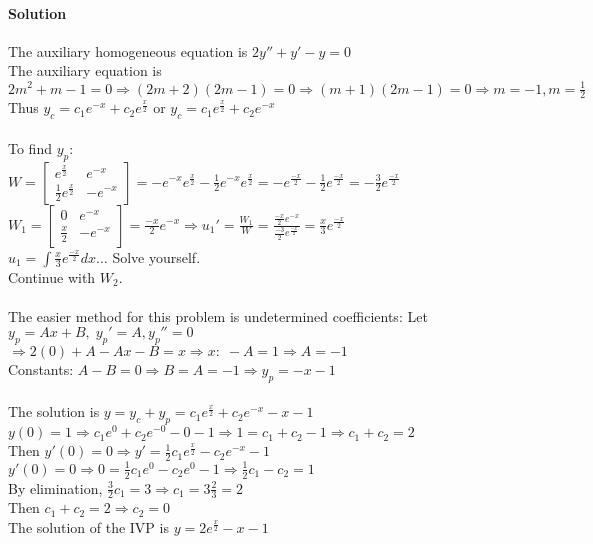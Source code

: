 \documentclass{article}
\newcommand{\mat}[4]{\begin{bmatrix} #1 & #2 \\ #3 & #4 \end{bmatrix}}
\begin{document}
\paragraph{Solution} The auxiliary homogeneous equation is $2y''+y'-y=0$
\\The auxiliary equation is $2m^2+m-1=0\Rightarrow(2m+2)(2m-1)=0\Rightarrow(m+1)(2m-1)=0\Rightarrow m=-1,m=\frac{1}{2}$
\\Thus $y_c=c_1e^{-x}+c_2e^{\frac{x}{2}}$ or $y_c=c_1e^{\frac{x}{2}}+c_2e^{-x}$
\\\\To find $y_p$:
\\$W=\mat{e^{\frac{x}{2}}}{e^{-x}}{\frac{1}{2}e^{\frac{x}{2}}}{-e^{-x}}=-e^{-x}e^{\frac{x}{2}}-\frac{1}{2}e^{-x}e^{\frac{x}{2}}=-e^{\frac{-x}{2}}-\frac{1}{2}e^{\frac{-x}{2}}=-\frac{3}{2}e^{\frac{-x}{2}}$
\newpage
$W_1=\mat{0}{e^{-x}}{\frac{x}{2}}{-e^{-x}}=\frac{-x}{2}e^{-x}\Rightarrow u_1'=\frac{W_1}{W}=\frac{\frac{-x}{2}e^{-x}}{\frac{-3}{2}e^{\frac{-x}{2}}}=\frac{x}{3}e^{\frac{-x}{2}}$
\\$u_1=\int\frac{x}{3}e^{\frac{-x}{2}}dx\dots$ Solve yourself.
\\Continue with $W_2$.
\\\\The easier method for this problem is undetermined coefficients: Let $y_p=Ax+B,\;y_p'=A,y_p''=0$
\\$\Rightarrow2(0)+A-Ax-B=x\Rightarrow x:\;-A=1\Rightarrow A=-1$
\\Constants: $A-B=0\Rightarrow B=A=-1\Rightarrow y_p=-x-1$
\\\\The solution is $y=y_c+y_p=c_1e^{\frac{x}{2}}+c_2e^{-x}-x-1$
\\$y(0)=1\Rightarrow c_1e^0+c_2e^{-0}-0-1\Rightarrow 1=c_1+c_2-1\Rightarrow c_1+c_2=2$
\\Then $y'(0)=0\Rightarrow y'=\frac{1}{2}c_1e^{\frac{x}{2}}-c_2e^{-x}-1$
\\$y'(0)=0\Rightarrow 0=\frac{1}{2}c_1e^0-c_2e^0-1\Rightarrow \frac{1}{2}c_1-c_2=1$
\\By elimination, $\frac{3}{2}c_1=3\Rightarrow c_1=3\frac{2}{3}=2$
\\Then $c_1+c_2=2\Rightarrow c_2=0$
\\The solution of the IVP is $y=2e^{\frac{x}{2}}-x-1$
\end{document}

